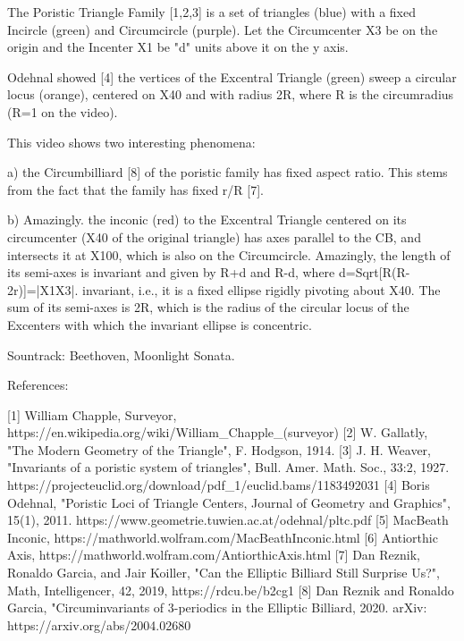 The Poristic Triangle Family [1,2,3] is a set of triangles (blue) with a fixed Incircle (green) and Circumcircle (purple). Let the Circumcenter X3 be on the origin and the Incenter X1 be "d" units above it on the y axis. 

Odehnal showed [4] the vertices of the Excentral Triangle (green) sweep a circular locus (orange), centered on X40 and with radius 2R, where R is the circumradius (R=1 on the video).

This video shows two interesting phenomena:

a) the Circumbilliard [8] of the poristic family has fixed aspect ratio. This stems from the fact that the family has fixed r/R [7].

b) Amazingly. the inconic (red) to the Excentral Triangle centered on its circumcenter (X40 of the original triangle) has axes parallel to the CB, and intersects it at X100, which is also on the Circumcircle. Amazingly, the length of its semi-axes is invariant and given by R+d and R-d, where d=Sqrt[R(R-2r)]=|X1X3|. invariant, i.e., it is a fixed ellipse rigidly pivoting about X40. The sum of its semi-axes is 2R, which is the radius of the circular locus of the Excenters with which the invariant ellipse is concentric.

Sountrack: Beethoven, Moonlight Sonata.

References:

[1] William Chapple, Surveyor, https://en.wikipedia.org/wiki/William_Chapple_(surveyor)
[2] W. Gallatly, "The Modern Geometry of the Triangle", F. Hodgson, 1914.
[3] J. H. Weaver, "Invariants of a poristic system of triangles", Bull. Amer. Math. Soc., 33:2, 1927. https://projecteuclid.org/download/pdf_1/euclid.bams/1183492031
[4] Boris Odehnal, "Poristic Loci of Triangle Centers, Journal of Geometry and Graphics", 15(1), 2011. https://www.geometrie.tuwien.ac.at/odehnal/pltc.pdf
[5] MacBeath Inconic, https://mathworld.wolfram.com/MacBeathInconic.html
[6] Antiorthic Axis, https://mathworld.wolfram.com/AntiorthicAxis.html
[7] Dan Reznik, Ronaldo Garcia, and Jair Koiller, "Can the Elliptic Billiard Still Surprise Us?", Math, Intelligencer, 42, 2019, https://rdcu.be/b2cg1
[8] Dan Reznik and Ronaldo Garcia, "Circuminvariants of 3-periodics in the Elliptic Billiard, 2020. arXiv: https://arxiv.org/abs/2004.02680